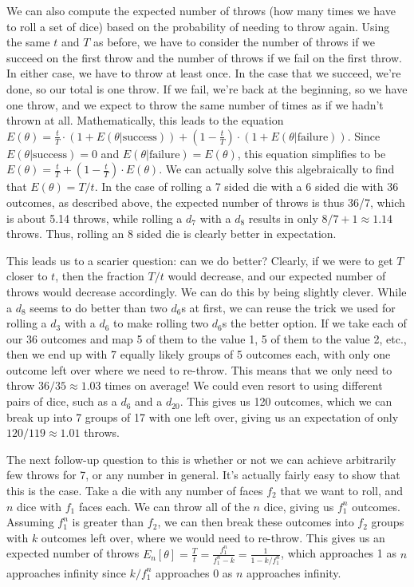 \documentclass{article}
\begin{document}
\par We can also compute the expected number of throws (how many times we have to roll a set of dice) based on the probability of needing to throw again.
Using the same $t$ and $T$ as before, we have to consider the number of throws if we succeed on the first throw and the number of throws if we fail on the first throw.
In either case, we have to throw at least once. 
In the case that we succeed, we're done, so our total is one throw.
If we fail, we're back at the beginning, so we have one throw, and we expect to throw the same number of times as if we hadn't thrown at all.
Mathematically, this leads to the equation $E(\theta) = \frac{t}{T} \cdot (1 + E(\theta | \text{success})) + \left(1 -\frac{t}{T} \right) \cdot (1 + E(\theta | \text{failure}))$.
Since $E(\theta | \text{success}) = 0$ and $E(\theta | \text{failure}) = E(\theta)$, this equation simplifies to be $E(\theta) = \frac{t}{T} + \left(1 - \frac{t}{T} \right) \cdot E(\theta)$.
We can actually solve this algebraically to find that $E(\theta) = T/t$. 
In the case of rolling a 7 sided die with a 6 sided die with 36 outcomes, as described above, the expected number of throws is thus 36/7, which is about 5.14 throws, while rolling a $d_7$ with a $d_8$ results in only $8/7 + 1 \approx 1.14$ throws.
Thus, rolling an 8 sided die is clearly better in expectation.

\par This leads us to a scarier question: can we do better?
Clearly, if we were to get $T$ closer to $t$, then the fraction $T/t$ would decrease, and our expected number of throws would decrease accordingly. 
We can do this by being slightly clever.
While a $d_8$ seems to do better than two $d_6$s at first, we can reuse the trick we used for rolling a $d_3$ with a $d_6$ to make rolling two $d_6$s the better option.
If we take each of our 36 outcomes and map 5 of them to the value 1, 5 of them to the value 2, etc., then we end up with 7 equally likely groups of 5 outcomes each, with only one outcome left over where we need to re-throw.
This means that we only need to throw $36/35 \approx 1.03$ times on average! 
We could even resort to using different pairs of dice, such as a $d_6$ and a $d_{20}$.
This gives us 120 outcomes, which we can break up into 7 groups of 17 with one left over, giving us an expectation of only $120/119 \approx 1.01$ throws.

\par The next follow-up question to this is whether or not we can achieve arbitrarily few throws for 7, or any number in general. 
It's actually fairly easy to show that this is the case.
Take a die with any number of faces $f_2$ that we want to roll, and $n$ dice with $f_1$ faces each.
We can throw all of the $n$ dice, giving us $f_1^n$ outcomes.
Assuming $f_1^n$ is greater than $f_2$, we can then break these outcomes into $f_2$ groups with $k$ outcomes left over, where we would need to re-throw.
This gives us an expected number of throws $E_n[\theta] = \frac{T}{t} = \frac{f_1^n}{f_1^n - k} = \frac{1}{1 - k/f_1^n}$, which approaches 1 as $n$ approaches infinity since $k/f_1^n$ approaches 0 as $n$ approaches infinity.
\end{document}
